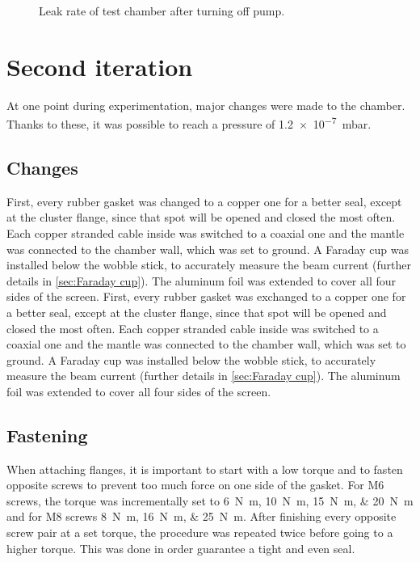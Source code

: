 \begin{figure}[ht]
	\centering
		
	\begin{tikzpicture}
		
	\end{tikzpicture}
	
	\caption{Leak rate of test chamber after turning off pump.}
	\label{fig:Leak rate of test chamber after turning off pump}
\end{figure}


\section{Second iteration}
\label{sec:Second iteration}

At one point during experimentation, major changes were made to the chamber. Thanks to these, it was possible to reach a pressure of \SI{1.2e-7}{\milli\bar}.

\subsection{Changes}
\label{subsec:Changes}

First, every rubber gasket was changed to a copper one for a better seal, except at the cluster flange, since that spot will be opened and closed the most often. Each copper stranded cable inside was switched to a coaxial one and the mantle was connected to the chamber wall, which was set to ground. A Faraday cup was installed below the wobble stick, to accurately measure the beam current (further details in \cref{sec:Faraday cup}). The aluminum foil was extended to cover all four sides of the screen.
First, every rubber gasket was exchanged to a copper one for a better seal, except at the cluster flange, since that spot will be opened and closed the most often. Each copper stranded cable inside was switched to a coaxial one and the mantle was connected to the chamber wall, which was set to ground. A Faraday cup was installed below the wobble stick, to accurately measure the beam current (further details in \cref{sec:Faraday cup}). The aluminum foil was extended to cover all four sides of the screen.

\subsection{Fastening}
\label{subsec:Fastening}

When attaching flanges, it is important to start with a low torque and to fasten opposite screws to prevent too much force on one side of the gasket. For M6 screws, the torque was incrementally set to \SIlist{6;10;15;20}{\newton\meter} and for M8 screws \SIlist{8;16;25}{\newton\meter}. After finishing every opposite screw pair at a set torque, the procedure was repeated twice before going to a higher torque. This was done in order guarantee a tight and even seal.